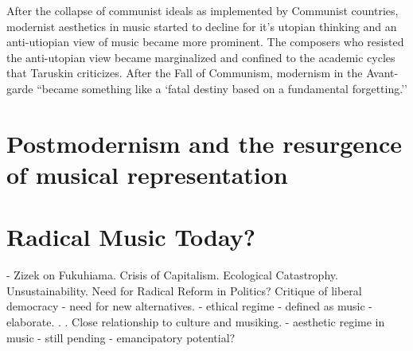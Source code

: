 After the collapse of communist ideals as implemented by Communist countries, modernist aesthetics in music started to decline for it's utopian thinking and an anti-utiopian view of music became more prominent. The composers who resisted the anti-utopian view became marginalized and confined to the academic cycles that Taruskin criticizes. After the Fall of Communism, modernism in the Avant-garde ``became something like a `fatal destiny based on a fundamental forgetting.''


\section{Postmodernism and the resurgence of musical representation}

\section{Radical Music Today?}

- Zizek on Fukuhiama. Crisis of Capitalism. Ecological Catastrophy. Unsustainability. Need for Radical Reform in Politics? Critique of liberal democracy - need for new alternatives.
- ethical regime - defined as music - elaborate. . . Close relationship to culture and musiking.
- aesthetic regime in music - still pending - emancipatory potential?


\label{ch:introduction}